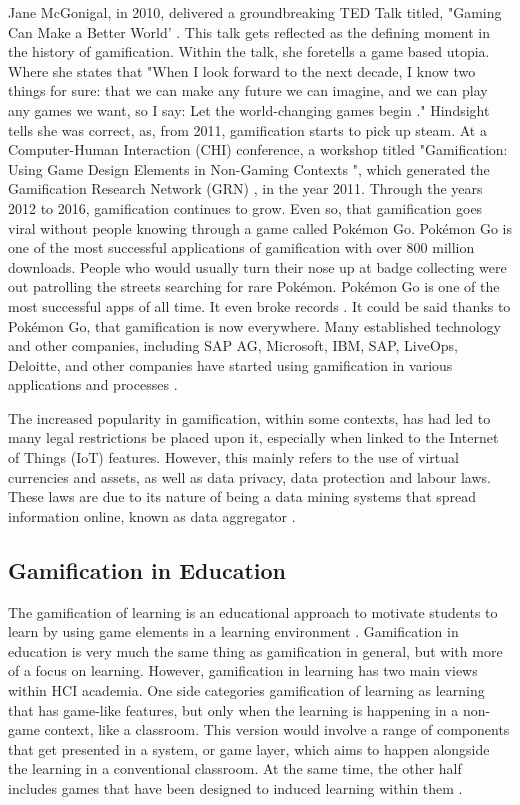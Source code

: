 	Jane McGonigal, in 2010, delivered a groundbreaking TED Talk titled, "Gaming Can Make a Better World' \cite{6}. This talk gets reflected as the defining moment in the history of gamification. Within the talk, she foretells a game based utopia. Where she states that "When I look forward to the next decade, I know two things for sure: that we can make any future we can imagine, and we can play any games we want, so I say: Let the world-changing games begin \cite{6}." Hindsight tells she was correct, as, from 2011, gamification starts to pick up steam.  At a Computer-Human Interaction (CHI) conference, a workshop titled "Gamification: Using Game Design Elements in Non-Gaming Contexts \cite{7}", which generated the Gamification Research Network (GRN) \cite{11}, in the year 2011. Through the years 2012 to 2016, gamification continues to grow. Even so, that gamification goes viral without people knowing through a game called Pokémon Go. Pokémon Go is one of the most successful applications of gamification with over 800 million downloads. People who would usually turn their nose up at badge collecting were out patrolling the streets searching for rare Pokémon. Pokémon Go is one of the most successful apps of all time. It even broke records \cite{3e,8}. It could be said thanks to Pokémon Go, that gamification is now everywhere. Many established technology and other companies, including SAP AG, Microsoft, IBM, SAP, LiveOps, Deloitte, and other companies have started using gamification in various applications and processes \cite{9}. 
	
	The increased popularity in gamification, within some contexts, has had led to many legal restrictions be placed upon it, especially when linked to the Internet of Things (IoT) features. However, this mainly refers to the use of virtual currencies and assets, as well as data privacy, data protection and labour laws. These laws are due to its nature of being a data mining systems that spread information online, known as data aggregator \cite{10, 11}. 
	
	
	\subsection{Gamification in Education}
	The gamification of learning is an educational approach to motivate students to learn by using game elements in a learning environment \cite{22}. Gamification in education is very much the same thing as gamification in general, but with more of a focus on learning. However, gamification in learning has two main views within HCI academia. One side categories gamification of learning as learning that has game-like features, but only when the learning is happening in a non-game context, like a classroom. This version would involve a range of components that get presented in a system, or game layer, which aims to happen alongside the learning in a conventional classroom. At the same time, the other half includes games that have been designed to induced learning within them \cite{22}. 
	
